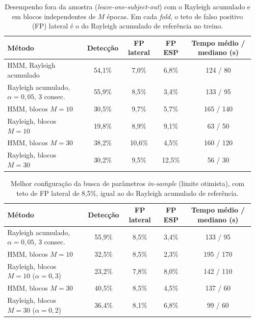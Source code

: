 \documentclass[a4paper,11pt]{article}
\begin{document}
\begin{table}[htbp]
\centering
\caption{Desempenho fora da amostra (\emph{leave-one-subject-out}) com o Rayleigh acumulado e em blocos independentes de $M$ épocas. Em cada \emph{fold}, o teto de falso positivo (FP) lateral é o do Rayleigh acumulado de referência no treino.}
\label{tab:resultados_loso}
\begin{tabular}{lcccc}
\toprule
Método & Detecção & FP lateral & FP ESP & Tempo médio / mediano (s) \\
\midrule
HMM, Rayleigh acumulado                         & 54,1\% & 7,0\%  & 6,8\%  & 124 / 80 \\
Rayleigh acumulado, $\alpha = 0{,}05$, 3 consec. & 55,9\% & 8,5\%  & 3,4\%  & 133 / 95 \\
\midrule
HMM, blocos $M = 10$                    & 30,5\% & 9,7\%  & 5,7\%  & 165 / 140 \\
Rayleigh, blocos $M = 10$     & 19,8\% & 8,9\%  & 9,1\%  & 63 / 50 \\
\midrule
HMM, blocos $M = 30$                    & 38,2\% & 10,6\% & 4,5\%  & 160 / 120 \\
Rayleigh, blocos $M = 30$     & 30,2\% & 9,5\%  & 12,5\% & 56 / 30 \\
\bottomrule
\end{tabular}
\end{table}

\begin{table}[htbp]
\centering
\caption{Melhor configuração da busca de parâmetros \emph{in-sample} (limite otimista), com teto de FP lateral de 8,5\%, igual ao do Rayleigh acumulado de referência.}
\label{tab:resultados_busca}
\begin{tabular}{lcccc}
\toprule
Método & Detecção & FP lateral & FP ESP & Tempo médio / mediano (s) \\
\midrule
Rayleigh acumulado, $\alpha = 0{,}05$, 3 consec. & 55,9\% & 8,5\% & 3,4\% & 133 / 95 \\
\midrule
HMM, blocos $M = 10$                                   & 32,5\% & 8,5\% & 2,3\% & 195 / 170 \\
Rayleigh, blocos $M = 10$ ($\alpha = 0{,}3$)           & 23,2\% & 7,8\% & 8,0\% & 142 / 110 \\
\midrule
HMM, blocos $M = 30$                                   & 40,5\% & 8,5\% & 4,5\% & 137 / 60 \\
Rayleigh, blocos $M = 30$ ($\alpha = 0{,}2$)           & 36,4\% & 8,1\% & 6,8\% & 99 / 60 \\
\bottomrule
\end{tabular}
\end{table}
\end{document}
